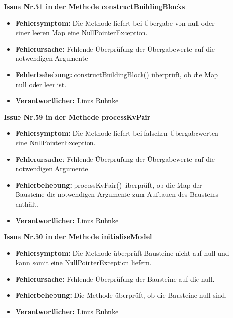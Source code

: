 \documentclass[parskip=full]{scrartcl}
\begin{document}
\begin{description}

\item []\textbf{Issue Nr.51 in der Methode constructBuildingBlocks} 

\begin{itemize}
\item []\textbf{Fehlersymptom:} Die Methode liefert bei Übergabe von null oder einer leeren Map eine NullPointerException.
\item []\textbf{Fehlerursache:} Fehlende Überprüfung der Übergabewerte auf die notwendigen Argumente
\item []\textbf{Fehlerbehebung:} constructBuildingBlock() überprüft, ob die Map null oder leer ist.
\item []\textbf{Verantwortlicher:} Linus Ruhnke
\end{itemize}

\item []\textbf{Issue Nr.59 in der Methode processKvPair} 

\begin{itemize}
\item []\textbf{Fehlersymptom:} Die Methode liefert bei falschen Übergabewerten eine NullPointerException.
\item []\textbf{Fehlerursache:} Fehlende Überprüfung der Übergabewerte auf die notwendigen Argumente
\item []\textbf{Fehlerbehebung:} processKvPair() überprüft, ob die Map der Bausteine die notwendigen Argumente zum Aufbauen des Bausteins enthält. 
\item []\textbf{Verantwortlicher:} Linus Ruhnke
\end{itemize}

\item []\textbf{Issue Nr.60 in der Methode initialiseModel} 

\begin{itemize}
\item []\textbf{Fehlersymptom:} Die Methode überprüft Bausteine nicht auf null und kann somit eine NullPointerException liefern.
\item []\textbf{Fehlerursache:} Fehlende Überprüfung der Bausteine auf die null.
\item []\textbf{Fehlerbehebung:} Die Methode überprüft, ob die Bausteine null sind.
\item []\textbf{Verantwortlicher:} Linus Ruhnke
\end{itemize}

\end{description}
\end{document}
